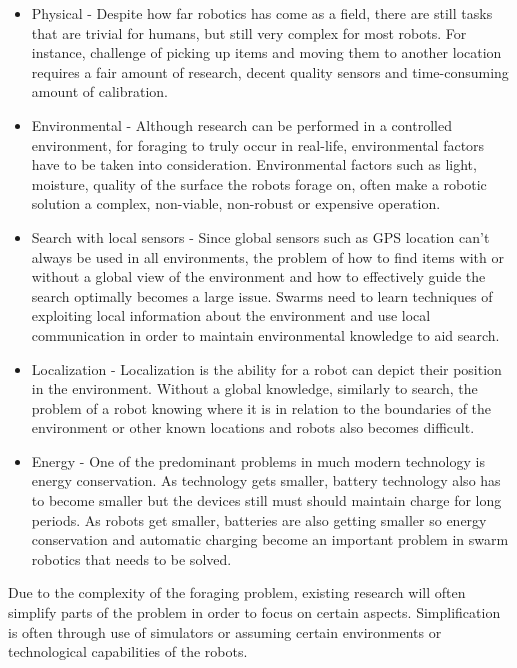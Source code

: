 \begin{itemize}
\item Physical - Despite how far robotics has come as a field, there are still tasks that are trivial for humans, but still very complex for most robots. For instance, challenge of picking up items and moving them to another location requires a fair amount of research, decent quality sensors and time-consuming amount of calibration. 

\item Environmental - Although research can be performed in a controlled environment, for foraging to truly occur in real-life, environmental factors have to be taken into consideration. Environmental factors such as light, moisture, quality of the surface the robots forage on, often make a robotic solution a complex, non-viable, non-robust or expensive operation. 

\item Search with local sensors - Since global sensors such as GPS location can't always be used in all environments, the problem of how to find items with or without a global view of the environment and how to effectively guide the search optimally becomes a large issue. Swarms need to learn techniques of exploiting local information about the environment and use local communication in order to maintain environmental knowledge to aid search. 

\item Localization - Localization is the ability for a robot can depict their position in the environment. Without a global knowledge, similarly to search, the problem of a robot knowing where it is in relation to the boundaries of the environment or other known locations and robots also becomes difficult.

\item Energy - One of the predominant problems in much modern technology is energy conservation. As technology gets smaller, battery technology also has to become smaller but the devices still must should maintain charge for long periods. As robots get smaller, batteries are also getting smaller so energy conservation and automatic charging become an important problem in swarm robotics that needs to be solved.

\end{itemize}

Due to the complexity of the foraging problem, existing research will often simplify parts of the problem in order to focus on certain aspects. Simplification is often through use of simulators or assuming certain environments or technological capabilities of the robots. 


